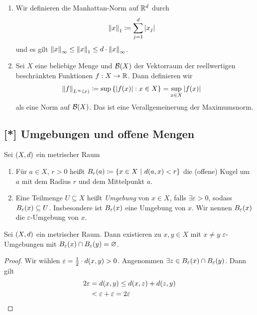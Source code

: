 \begin{beispiel}
\begin{enumerate}
        \item Wir definieren die Manhattan-Norm auf $\mathbb{R}^d$ durch
        \begin{align*}
            \left\lVert x\right\rVert_1 &\coloneqq \sum_{j=1}^{d} \left\lvert x_j\right\rvert
        \end{align*}
        und es gilt $\left\lVert x\right\rVert_{\infty} \leq \left\lVert x\right\rVert_1 \leq d \cdot \left\lVert x\right\rVert_{\infty}$.
        \item Sei $X$ eine beliebige Menge und $\mathcal{B}\of{X}$ der Vektorraum der reellwertigen beschränkten Funktionen $f: X\rightarrow{} \mathbb{R}$. Dann definieren wir
        \begin{align*}
            \norm{f}_{L^{\infty}\of{x}} &\coloneqq \sup\set{\abs{f\of{x}}: x\in X} = \sup_{x\in X} \abs{f\of{x}}
        \end{align*}
        als eine Norm auf $\mathcal{B}\of{X}$. Das ist eine Verallgemeinerung der Maximumsnorm.
    \end{enumerate}
\end{beispiel}

\subsection{[*] Umgebungen und offene Mengen}

\begin{definition}[Umgebung]
    Sei $\left(X, d\right)$ ein metrischer Raum
    \begin{enumerate}[label=(\alph*)]
        \item Für $a\in X$, $r > 0$ heißt $B_r\of{a} \coloneqq \set{x\in X ~\middle\vert~ d\of{a, x} < r}$ die (offene) Kugel um $a$ mit dem Radius $r$ und dem Mittelpunkt $a$.
        \item Eine Teilmenge $U\subseteq X$ heißt \emph{Umgebung} von $x\in X$, falls $\exists\varepsilon > 0$, sodass $B_{\varepsilon}\of{x} \subseteq U$. Insbesondere ist $B_{\varepsilon}\of{x}$ eine Umgebung von $x$. Wir nennen $B_{\varepsilon}\of{x}$ die $\varepsilon$-Umgebung von $x$.
    \end{enumerate}
\end{definition}

\begin{satz}
    \label{satz:hausdorff-trennungsaxiom}
    Sei $\left(X, d\right)$ ein metrischer Raum. Dann existieren zu $x,y\in X$ mit $x\neq y$ $\varepsilon$-Umgebungen mit $B_{\varepsilon}\of{x} \cap B_{\varepsilon}\of{y} = \emptyset$.
    \begin{proof}
        Wir wählen $\varepsilon = \frac{1}{2}\cdot d\of{x,y} > 0$. Angenommen $\exists z\in B_{\varepsilon}\of{x} \cap B_{\varepsilon}\of{y}$. Dann gilt
        \begin{align*}
            2\varepsilon &= d\of{x,y} \leq d\of{x,z} + d\of{z,y}\\
            &< \varepsilon + \varepsilon = 2\varepsilon\qedhere
        \end{align*}
    \end{proof}
\end{satz}

